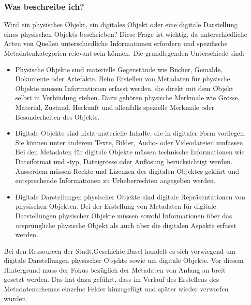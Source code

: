 \documentclass[
  nswissgerman,
  letterpaper,
  DIV=11,
  numbers=noendperiod]{scrartcl}
\providecommand{\tightlist}{%
  \setlength{\itemsep}{0pt}\setlength{\parskip}{0pt}}
\begin{document}
\subsubsection{Was beschreibe ich?}\label{was-beschreibe-ich}

Wird ein physisches Objekt, ein digitales Objekt oder eine digitale
Darstellung eines physischen Objekts beschrieben? Diese Frage ist
wichtig, da unterschiedliche Arten von Quellen unterschiedliche
Informationen erfordern und spezifische Metadatenkategorien relevant
sein können. Die grundlegenden Unterschiede sind:

\begin{itemize}
\tightlist
\item
  Physische Objekte sind materielle Gegenstände wie Bücher, Gemälde,
  Dokumente oder Artefakte. Beim Erstellen von Metadaten für physische
  Objekte müssen Informationen erfasst werden, die direkt mit dem Objekt
  selbst in Verbindung stehen. Dazu gehören physische Merkmale wie
  Grösse, Material, Zustand, Herkunft und allenfalls spezielle Merkmale
  oder Besonderheiten des Objekts.
\item
  Digitale Objekte sind nicht-materielle Inhalte, die in digitaler Form
  vorliegen. Sie können unter anderem Texte, Bilder, Audio- oder
  Videodateien umfassen. Bei den Metadaten für digitale Objekte müssen
  technische Informationen wie Dateiformat und -typ, Dateigrösse oder
  Auflösung berücksichtigt werden. Ausserdem müssen Rechte und Lizenzen
  des digitalen Objektes geklärt und entsprechende Informationen zu
  Urheberrechten angegeben werden.
\item
  Digitale Darstellungen physischer Objekte sind digitale
  Repräsentationen von physischen Objekten. Bei der Erstellung von
  Metadaten für digitale Darstellungen physischer Objekte müssen sowohl
  Informationen über das ursprüngliche physische Objekt als auch über
  die digitalen Aspekte erfasst werden.
\end{itemize}

\begin{tcolorbox}[enhanced jigsaw, arc=.35mm, bottomrule=.15mm, bottomtitle=1mm, breakable, colback=white, colbacktitle=quarto-callout-tip-color!10!white, colframe=quarto-callout-tip-color-frame, coltitle=black, left=2mm, leftrule=.75mm, opacityback=0, opacitybacktitle=0.6, rightrule=.15mm, title=\textcolor{quarto-callout-tip-color}{\faLightbulb}\hspace{0.5em}{Erfahrungen der Stadt.Geschichte.Basel}, titlerule=0mm, toprule=.15mm, toptitle=1mm]

Bei den Ressourcen der Stadt.Geschichte.Basel handelt es sich vorwiegend
um digitale Darstellungen physischer Objekte sowie um digitale Objekte.
Vor diesem Hintergrund muss der Fokus bezüglich der Metadaten von Anfang
an breit gesetzt werden. Das hat dazu geführt, dass im Verlauf des
Erstellens des Metadatenschemas einzelne Felder hinzugefügt und später
wieder verworfen wurden.

\end{tcolorbox}
\end{document}
